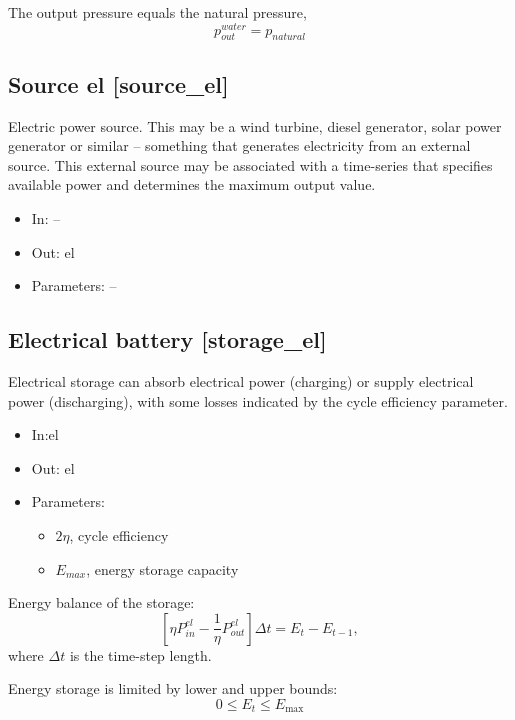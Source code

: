 \documentclass[12pt]{article}
\begin{document}
\medskip\noindent
The output pressure equals the natural pressure,
\begin{equation}
	p^{water}_{out} = p_{natural}
\end{equation}



\subsection{Source el [source\_el]}

Electric power source. This may be a wind turbine, diesel generator, solar power generator or similar – something that generates electricity from an external source. 
This external source may be associated with a time-series that specifies available power and determines the maximum output value.

\begin{itemize}
\item In: --
\item Out: el
\item Parameters: --
\end{itemize}


\subsection{Electrical battery [storage\_el]}
Electrical storage can absorb electrical power (charging) or supply electrical power (discharging), with some losses indicated by the cycle efficiency parameter.

\begin{itemize}
\item In:el
\item Out: el
\item Parameters:
\begin{itemize}[noitemsep,topsep=0pt]
	\item $2\eta$,  cycle efficiency
	\item $E_{max}$,  energy storage capacity
\end{itemize}
\end{itemize}

\medskip\noindent
Energy balance of the storage:
\begin{equation}
	 \left[  \eta P_{in}^{el}-\frac{1}{ \eta }P_{out}^{el} \right]  \Delta t=E_{t}-E_{t-1}, 
\end{equation}
where  $\Delta t$  is the time-step length.


Energy storage is limited by lower and upper bounds:
 \begin{equation}
 0 \leq E_{t} \leq E_{\max } 
 \end{equation}
 
\end{document}
